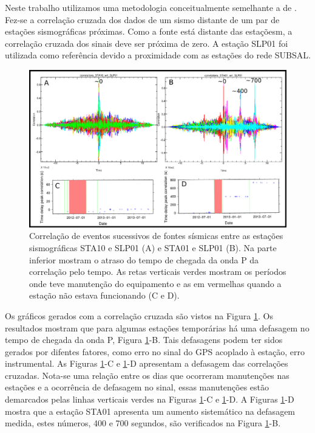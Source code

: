 Neste trabalho utilizamos uma metodologia conceitualmente semelhante a de \cite{gibbons_identification_2006}. Fez-se a correlação cruzada dos dados de um sismo distante de um par de estações sismográficas próximas. Como a fonte está distante das estaçõesm, a correlação cruzada dos sinais deve ser próxima de zero. A estação SLP01 foi utilizada como referência devido a proximidade com as estações do rede SUBSAL. 

\begin{figure}[!ht]
\centering
\includegraphics[scale=0.3]{Figs/correlacao_tempo_de_chegada_resultado.png}
\caption[Correlação de eventos sucessivos de fontes sísmicas entre duas estações sismográficas]{Correlação de eventos sucessivos de fontes sísmicas entre as estações sismográficas STA10 e SLP01 (A) e  STA01 e SLP01 (B). Na parte inferior mostram o atraso do tempo de chegada da onda P da correlação pelo tempo. As retas verticais verdes mostram os períodos onde teve manutenção do equipamento e as em vermelhas quando a estação não estava funcionando (C e D).}
\label{teste_tempo_results}
\end{figure}

Os gráficos gerados com a correlação cruzada são vistos na Figura \ref{teste_tempo_results}. Os resultados mostram que para algumas estações temporárias há uma defasagem no tempo de chegada da onda P, Figura \ref{teste_tempo_results}-B. Tais defasagens podem ter sidos gerados por difentes fatores, como erro no sinal do GPS acoplado à estação, erro instrumental. As Figuras \ref{teste_tempo_results}-C e \ref{teste_tempo_results}-D apresentam a defasagem das correlações cruzadas. Nota-se uma relação entre os  dias que ocorreram manutenções nas estações  e a ocorrência de defasagem no sinal, essas manutenções estão demarcados pelas linhas verticais verdes na Figuras \ref{teste_tempo_results}-C e \ref{teste_tempo_results}-D. A Figuras \ref{teste_tempo_results}-D mostra que a estação STA01 apresenta um aumento sistemático na defasagem medida, estes números, 400 e 700 segundos, são verificados na Figura \ref{teste_tempo_results}-B.

